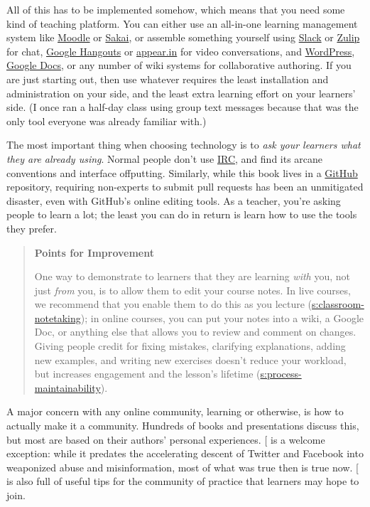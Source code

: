 All of this has to be implemented somehow, which means that you need
some kind of teaching platform. You can either use an all-in-one
learning management system like \href{http://moodle.org}{Moodle} or \href{https://www.sakaiproject.org/}{Sakai}, or
assemble something yourself using \href{http://slack.com}{Slack} or \href{https://zulipchat.com/}{Zulip} for
chat, \href{http://hangouts.google.com}{Google Hangouts} or \href{https://appear.in/}{appear.in} for
video conversations, and \href{https://wordpress.org/}{WordPress}, \href{http://docs.google.com}{Google
Docs}, or any number of wiki systems for collaborative
authoring. If you are just starting out, then use whatever requires
the least installation and administration on your side, and the least
extra learning effort on your learners' side. (I once ran a half-day
class using group text messages because that was the only tool
everyone was already familiar with.)

The most important thing when choosing technology is to \emph{ask your
learners what they are already using}. Normal people don't use
\href{https://en.wikipedia.org/wiki/Internet_Relay_Chat}{IRC}, and find its arcane conventions and interface
offputting. Similarly, while this book lives in a \href{http://github.com}{GitHub}
repository, requiring non-experts to submit pull requests has been an
unmitigated disaster, even with GitHub's online editing tools. As a
teacher, you're asking people to learn a lot; the least you can do in
return is learn how to use the tools they prefer.

\begin{quote}\setlength{\parindent}{0pt}
\textbf{Points for Improvement}

One way to demonstrate to learners that they are learning \emph{with} you,
not just \emph{from} you, is to allow them to edit your course notes. In
live courses, we recommend that you enable them to do this as you
lecture (\protect\hyperlink{SECTION}{s:classroom-notetaking}); in online courses, you
can put your notes into a wiki, a Google Doc, or anything else that
allows you to review and comment on changes. Giving people credit for
fixing mistakes, clarifying explanations, adding new examples, and
writing new exercises doesn't reduce your workload, but increases
engagement and the lesson's lifetime
(\protect\hyperlink{SECTION}{s:process-maintainability}).
\end{quote}

A major concern with any online community, learning or otherwise, is how
to actually make it a community. Hundreds of books and presentations
discuss this, but most are based on their authors' personal experiences.
{[}\protect[\hyperlink{b:Krau2016}{Krau2016}]{]} is a welcome exception: while it predates the
accelerating descent of Twitter and Facebook into weaponized abuse and
misinformation, most of what was true then is true now.
{[}\protect[\hyperlink{b:Foge2005}{Foge2005}]{]} is also full of useful tips for the community of
practice that learners may hope to join.

